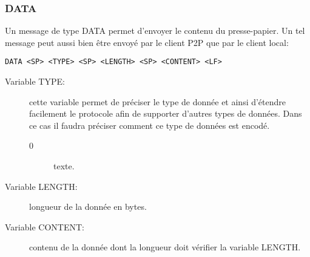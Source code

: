 \subsubsection*{DATA}
Un message de type DATA permet d'envoyer le contenu du presse-papier. Un tel
message peut aussi bien être envoyé par le client P2P que par le client local:
\begin{verbatim}
DATA <SP> <TYPE> <SP> <LENGTH> <SP> <CONTENT> <LF>
\end{verbatim}
\begin{description}
\item[Variable TYPE:] cette variable permet de préciser le type
  de donnée et ainsi d'étendre facilement le protocole afin de supporter
  d'autres types de données. Dans ce cas il faudra préciser comment ce type
  de données est encodé.
  \begin{description}
  \item[0] texte.
  \end{description}
\item[Variable LENGTH:] longueur de la donnée en bytes.
\item[Variable CONTENT:] contenu de la donnée dont la longueur
  doit vérifier la variable LENGTH.
\end{description}
